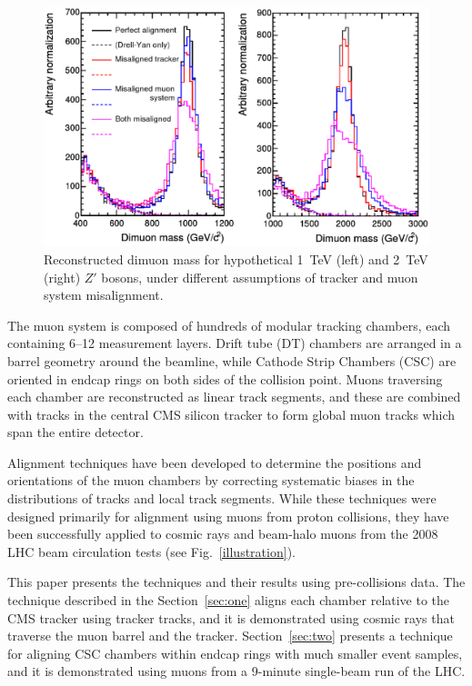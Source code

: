 \begin{figure}
\centering
\includegraphics[width=\linewidth]{misaligned_spectra.eps}
\caption{Reconstructed dimuon mass for hypothetical 1~TeV (left) and
  2~TeV (right) $Z'$ bosons, under different assumptions of tracker
  and muon system misalignment.} \label{misaligned_spectra}
\end{figure}

The muon system is composed of hundreds of modular tracking chambers,
each containing 6--12 measurement layers.  Drift tube (DT) chambers
are arranged in a barrel geometry around the beamline, while Cathode
Strip Chambers (CSC) are oriented in endcap rings on both sides of the
collision point.  Muons traversing each chamber are reconstructed as
linear track segments, and these are combined with tracks in the
central CMS silicon tracker to form global muon tracks which span the
entire detector.

Alignment techniques have been developed to determine the positions
and orientations of the muon chambers by correcting systematic biases
in the distributions of tracks and local track segments.  While
these techniques were designed primarily for alignment using muons
from proton collisions, they have been successfully applied to cosmic
rays and beam-halo muons from the 2008 LHC beam circulation tests (see
Fig.~\ref{illustration}).

This paper presents the techniques and their results using
pre-collisions data.  The technique described in the
Section~\ref{sec:one} aligns each chamber relative to the CMS tracker
using tracker tracks, and it is demonstrated using cosmic rays
that traverse the muon barrel and the tracker.  Section~\ref{sec:two}
presents a technique for aligning CSC chambers within endcap rings
with much smaller event samples, and it is demonstrated using muons
from a 9-minute single-beam run of the LHC.

